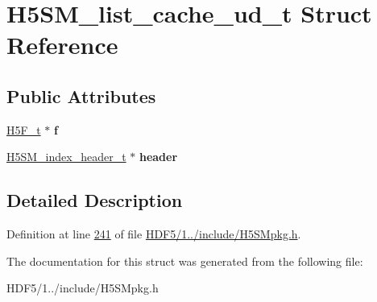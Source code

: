 \hypertarget{struct_h5_s_m__list__cache__ud__t}{}\section{H5\+S\+M\+\_\+list\+\_\+cache\+\_\+ud\+\_\+t Struct Reference}
\label{struct_h5_s_m__list__cache__ud__t}
\subsection*{Public Attributes}
\begin{DoxyCompactItemize}
\item 
\mbox{\label{struct_h5_s_m__list__cache__ud__t_a44fcd8e718a1c74418bce45e42513268}} 
\hyperlink{struct_h5_f__t}{H5\+F\+\_\+t} $\ast$ {\bfseries f}
\item 
\mbox{\label{struct_h5_s_m__list__cache__ud__t_a1d95319456d30dd88c83e6f688a594b5}} 
\hyperlink{struct_h5_s_m__index__header__t}{H5\+S\+M\+\_\+index\+\_\+header\+\_\+t} $\ast$ {\bfseries header}
\end{DoxyCompactItemize}


\subsection{Detailed Description}


Definition at line \hyperlink{_h_d_f5_21_810_81_2include_2_h5_s_mpkg_8h_source_l00241}{241} of file \hyperlink{_h_d_f5_21_810_81_2include_2_h5_s_mpkg_8h_source}{H\+D\+F5/1../include/\+H5\+S\+Mpkg.\+h}.



The documentation for this struct was generated from the following file\+:\begin{DoxyCompactItemize}
\item 
H\+D\+F5/1../include/\+H5\+S\+Mpkg.\+h\end{DoxyCompactItemize}
